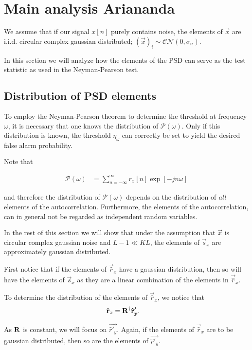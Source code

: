\documentclass[a4paper, openany, oneside]{memoir}
\begin{document}
\section{Main analysis Ariananda}

We assume that if our signal $x[n]$ purely contains noise, the elements of $\vec{x}$ are i.i.d. circular complex gaussian distributed; $(\vec{x})_i \sim \mathcal{CN}(0,\sigma_n)$. 

In this section we will analyze how the elements of the PSD can serve as the test statistic as used in the Neyman-Pearson test. 

\subsection{Distribution of PSD elements}
To employ the Neyman-Pearson theorem to determine the threshold at frequency $\omega$, it is necessary that one knows the distribution of $\mathcal{P}\left(\omega\right)$. Only if this distribution is known, the threshold $\eta_{\omega}$ can correctly be set to yield the desired false alarm probability.

Note that 

\begin{align*}
\mathcal{P}\left(\omega\right) &= \sum_{n=-\infty}^{\infty} r_{x}[n] \exp\left[-jn\omega\right]
\end{align*}

and therefore the distribution of $\mathcal{P}(\omega)$ depends on the distribution of \emph{all} elements of the autocorrelation. Furthermore, the elements of the autocorrelation, can in general not be regarded as independent random variables. 

In the rest of this section we will show that under the assumption that $\vec{x}$ is circular complex gaussian noise and $L-1 \ll KL$, the elements of $\vec{s}_x$ are approximately gaussian distributed.

First notice that if the elements of $\vec{\hat{r}}_x$ have a gaussian distribution, then so will have the elements of $\vec{s}_x$ as they are a linear combination of the elements in $\vec{\hat{r}}_x$.

To determine the distribution of the elements of $\vec{\hat{r}}_x$, we notice that 
\begin{align*}
\boldsymbol{\mathbf{\hat{r}}}_x &= \boldsymbol{\mathbf{R}}^{\dagger}\boldsymbol{\mathbf{\hat{r}'_y}}.
\end{align*}

As $\boldsymbol{\mathbf{R}}$ is constant, we will focus on $\vec{\hat{r}'_y}$. Again, if the elements of $\vec{\hat{r}}_x$ are to be gaussian distributed, then so are the elements of $\vec{\hat{r}'_y}$.
\end{document}

